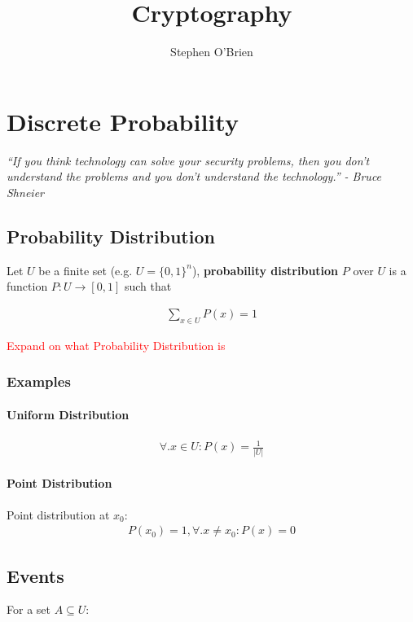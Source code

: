 \documentclass[11pt,a4paper]{report}
\title{Cryptography}
\author{Stephen O'Brien}
\newcommand\todo[1]{\noindent\textcolor{red}{#1}}
\begin{document}
\maketitle
\chapter{Discrete Probability}
\begin{center}
		\emph{
			``If you think technology can solve your security problems, then you don't understand the problems and you don't understand the technology.'' - Bruce Shneier
		}
\end{center}



\section{Probability Distribution}
Let $U$ be a finite set (e.g. $U = \{0,1\}^n$), \textbf{probability distribution} $P$ over $U$ is a function $P : U \rightarrow [0,1]$ such that

\begin{gather}
	\sum\limits_{x \in  U} P(x) = 1
\end{gather}

\todo{Expand on what Probability Distribution is}

\subsection{Examples}
\subsubsection{Uniform Distribution}
\begin{gather}
	\forall . x \in U : P(x) = \frac{1}{|U|}
\end{gather}
\subsubsection{Point Distribution}
Point distribution at $x_0$:
\begin{gather}
	P(x_0) = 1, \forall.x \neq x_0 : P(x) = 0
\end{gather}

	
	
\section{Events}
For a set $A \subseteq U$:
\end{document}
